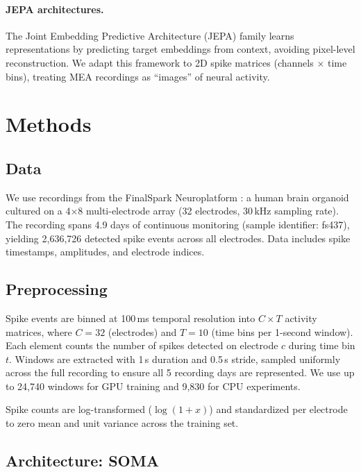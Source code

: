 \documentclass{article}
\begin{document}
\paragraph{JEPA architectures.}
The Joint Embedding Predictive Architecture (JEPA) family \citep{assran2023ijepa, bardes2024vjepa} learns representations by predicting target embeddings from context, avoiding pixel-level reconstruction. We adapt this framework to 2D spike matrices (channels $\times$ time bins), treating MEA recordings as ``images'' of neural activity.

\section{Methods}

\subsection{Data}

We use recordings from the FinalSpark Neuroplatform \citep{jordan2024open}: a human brain organoid cultured on a 4$\times$8 multi-electrode array (32 electrodes, 30\,kHz sampling rate). The recording spans 4.9 days of continuous monitoring (sample identifier: fs437), yielding 2,636,726 detected spike events across all electrodes. Data includes spike timestamps, amplitudes, and electrode indices.

\subsection{Preprocessing}

Spike events are binned at 100\,ms temporal resolution into $C \times T$ activity matrices, where $C = 32$ (electrodes) and $T = 10$ (time bins per 1-second window). Each element counts the number of spikes detected on electrode $c$ during time bin $t$. Windows are extracted with 1\,s duration and 0.5\,s stride, sampled uniformly across the full recording to ensure all 5 recording days are represented. We use up to 24,740 windows for GPU training and 9,830 for CPU experiments.

Spike counts are log-transformed ($\log(1 + x)$) and standardized per electrode to zero mean and unit variance across the training set.

\subsection{Architecture: SOMA}
\end{document}
